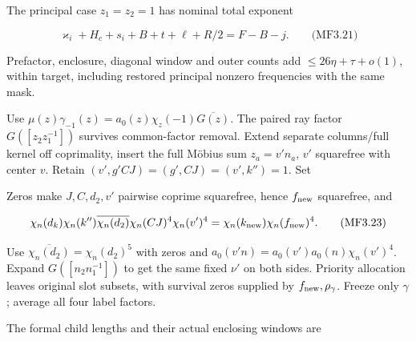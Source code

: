 The principal case \(z_1=z_2=1\) has nominal total exponent

\hypertarget{mf:eq:B3.21}{}

\label{mf:eq:B3.21}

\[
\varkappa_i+H_c+s_i+B+t+\ell+R/2=F-B-j.
\qquad\text{(MF3.21)}
\]

Prefactor, enclosure, diagonal window and outer counts add \(\le26\eta+\tau+o(1)\), within target, including restored principal nonzero frequencies with the same mask.

Use \(\mu(z)\gamma_{-1}(z)=a_0(z)\chi_z(-1)\overline{G(z)}\). The paired ray factor \(G([z_2z_1^{-1}])\) survives common-factor removal. Extend separate columns/full kernel off coprimality, insert the full Möbius sum \(z_a=v'n_a\), \(v'\) squarefree with center \(v\). Retain \((v',g'CJ)=(g',CJ)=(v',k'')=1\). Set

\hypertarget{mf:eq:B3.22}{}

\label{mf:eq:B3.22}

\par\noindent\resizebox{\linewidth}{!}{\begin{minipage}{\dimexpr\linewidth+57.87354pt\relax}\[
\gamma=(q_0,t',r_g),\quad r_g=g'/d_2,\qquad
k_{\rm new}=d_kd_2k'',\qquad f_{\rm new}=JCd_2v',
\qquad\rho_\gamma(n)=\rho(n)\mathbf1_{(n,\operatorname{rad}(q_0t'r_g))=1}.
\qquad\text{(MF3.22)}
\]\end{minipage}}\par

Zeros make \(J,C,d_2,v'\) pairwise coprime squarefree, hence \(f_{\rm new}\) squarefree, and

\hypertarget{mf:eq:B3.23}{}

\label{mf:eq:B3.23}

\[
\chi_n(d_k)\chi_n(k'')\overline{\chi_n(d_2)}
 \chi_n(CJ)^4\chi_n(v')^4
=\chi_n(k_{\rm new})\chi_n(f_{\rm new})^4.
\qquad\text{(MF3.23)}
\]

Use \(\overline{\chi_n(d_2)}=\chi_n(d_2)^5\) with zeros and \(a_0(v'n)=a_0(v')a_0(n)\chi_n(v')^4\). Expand \(G([n_2n_1^{-1}])\) to get the same fixed \(\nu'\) on both sides. Priority allocation leaves original slot subsets, with survival zeros supplied by \(f_{\rm new},\rho_\gamma\). Freeze only \(\gamma\); average all four label factors.

The formal child lengths and their actual enclosing windows are

\hypertarget{mf:eq:B3.24}{}

\label{mf:eq:B3.24}

